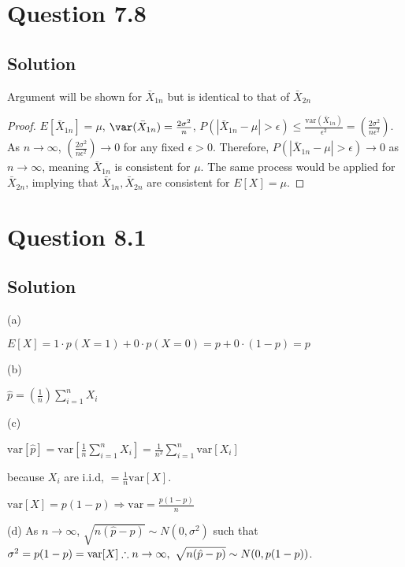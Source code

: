 \documentclass[10pt, a4paper]{article}
\begin{document}
  \section{Question 7.8}
    \subsection{Solution}
    Argument will be shown for $\bar X_{1n}$ but is identical to that of $\bar X_{2n}$ 
    \begin{proof}
      $E[\bar X_{1n}]=\mu$, 
      $\var(\bar X_{1n})=\frac{2\sigma^2}{n}$,
      $P(|\bar X_{1n}-\mu|>\epsilon)\leq\frac{\mathrm{var}(\bar X_{1n})}{\epsilon^2} = (\frac{2\sigma^2}{n\epsilon^2})$.
      As $n\rightarrow\infty$, $(\frac{2\sigma^2}{n\epsilon^2})\rightarrow0$ for any fixed $\epsilon>0$. Therefore, $P(|\bar X_{1n}-\mu|>\epsilon)\rightarrow0$ as $n\rightarrow\infty$, meaning $\bar X_{1n}$ is consistent for $\mu$. The same process would be applied for $\bar X_{2n}$, implying that $\bar X_{1n}, \bar X_{2n}$ are consistent for $E[X]=\mu$. 
    \end{proof}
  \section{Question 8.1}
    \subsection{Solution}

    (a)
    \begin{center}
      $E[X]=1\cdot p(X=1)+0\cdot p(X=0) = p + 0\cdot(1-p) = p$
    \end{center}

    (b) 
    \begin{center}
      $\hat{p}=(\frac{1}{n})\sum_{i=1}^n X_i$
    \end{center}

    (c)
    \begin{center}
      $\mathrm{var}[\hat{p}] = \mathrm{var}[\frac{1}{n}\sum^n_{i=1}X_i]=\frac{1}{n^2}\sum_{i=1}^n\mathrm{var}[X_i]$
    \end{center}
    because $X_i$ are i.i.d, $=\frac{1}{n}\mathrm{var}[X]$.
    \begin{center}
      $\mathrm{var}[X]=p(1-p)\Rightarrow\mathrm{var}=\frac{p(1-p)}{n}$
    \end{center}

    (d)
    As $n\rightarrow\infty$, $\sqrt{n(\hat{p}-p)}\sim N(0,\sigma^2)$ such that $\sigma^2=p(1-p)=\mathrm{var}[X]\therefore \\ n\rightarrow\infty, \ \sqrt{n(\hat{p}-p)}\sim N(0,p(1-p))$. 
\end{document}
